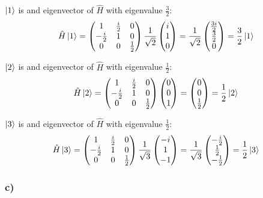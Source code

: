 \documentclass{article}
\newcommand*\colvec[3][]{
    \begin{pmatrix}\ifx\relax#1\relax\else#1\\\fi#2\\#3\end{pmatrix}
}
\begin{document}
$\ket{1}$ is and eigenvector of $\hat{H}$ with eigenvalue $\frac{3}{2}$:
\begin{equation}
\hat{H}\ket{1} = 
\begin{pmatrix}
1 & \frac{i}{2} & 0 \\
-\frac{i}{2} & 1 & 0 \\
0 & 0 & \frac{1}{2}
\end{pmatrix}
\frac{1}{\sqrt{2}}\colvec[i]{1}{0} =
\frac{1}{\sqrt{2}}\colvec[\frac{3i}{2}]{\frac{3}{2}}{0} =
\frac{3}{2}\ket{1}
\end{equation}

$\ket{2}$ is and eigenvector of $\hat{H}$ with eigenvalue $\frac{1}{2}$:
\begin{equation}
\hat{H}\ket{2} = 
\begin{pmatrix}
1 & \frac{i}{2} & 0 \\
-\frac{i}{2} & 1 & 0 \\
0 & 0 & \frac{1}{2}
\end{pmatrix}
\colvec[0]{0}{1} =
\colvec[0]{0}{\frac{1}{2}} =
\frac{1}{2}\ket{2}
\end{equation}

$\ket{3}$ is and eigenvector of $\hat{H}$ with eigenvalue $\frac{1}{2}$:
\begin{equation}
\hat{H}\ket{3} = 
\begin{pmatrix}
1 & \frac{i}{2} & 0 \\
-\frac{i}{2} & 1 & 0 \\
0 & 0 & \frac{1}{2}
\end{pmatrix}
\frac{1}{\sqrt{3}}\colvec[-i]{1}{-1} =
\frac{1}{\sqrt{3}}\colvec[-\frac{i}{2}]{\frac{1}{2}}{-\frac{1}{2}} =
\frac{1}{2}\ket{3}
\end{equation}

\subsubsection{c)}
\end{document}
